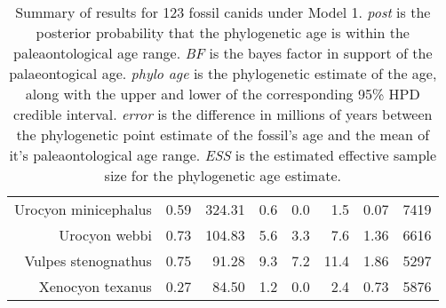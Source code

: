 \begin{table}[ht]
\begin{tabular}{rrrrrrrr}
  Urocyon minicephalus & 0.59 & 324.31 & 0.6 & 0.0 & 1.5 & 0.07 & 7419 \\ 
  Urocyon webbi & 0.73 & 104.83 & 5.6 & 3.3 & 7.6 & 1.36 & 6616 \\ 
  Vulpes stenognathus & 0.75 & 91.28 & 9.3 & 7.2 & 11.4 & 1.86 & 5297 \\ 
  Xenocyon texanus & 0.27 & 84.50 & 1.2 & 0.0 & 2.4 & 0.73 & 5876 \\ 
   \hline
\end{tabular}
\caption{Summary of results for 123 fossil canids under Model 1. {\em post} is the posterior probability that the phylogenetic age is within the paleaontological age range. {\em BF} is the bayes factor in support of the palaeontogical age. {\em phylo age} is the phylogenetic estimate of the age, along with the upper and lower of the corresponding 95\% HPD credible interval. {\em error} is the difference in millions of years between the phylogenetic point estimate of the fossil's age and the mean of it's paleaontological age range. {\em ESS} is the estimated effective sample size for the phylogenetic age estimate.} 
\label{fossilTable_c}
\end{table}
